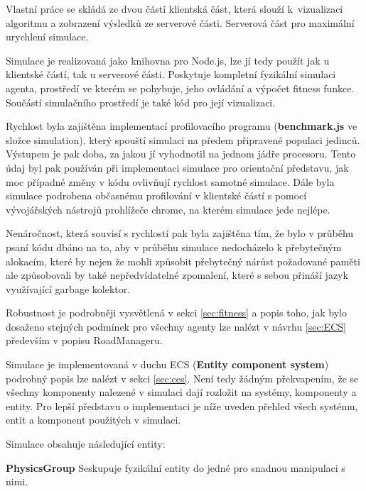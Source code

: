 



Vlastní práce se skládá ze dvou částí klientská část, která slouží k~vizualizaci algoritmu a zobrazení výsledků ze serverové části. Serverová část pro maximální urychlení simulace. 

Simulace je realizovaná jako knihovna pro Node.js, lze jí tedy použít jak u klientské částí, tak u serverové části. Poskytuje kompletní fyzikální simulaci agenta, prostředí ve kterém se pohybuje, jeho ovládání a výpočet fitness funkce. Součástí simulačního prostředí je také kód pro její vizualizaci.


Rychlost byla zajištěna implementací profilovacího programu (\textbf{benchmark.js} ve složce simulation), který spouští simulaci na předem připravené populaci jedinců. Výstupem je pak doba, za jakou jí vyhodnotil na jednom jádře procesoru. Tento údaj byl pak používán při implementaci simulace pro orientační představu, jak moc případné změny v kódu ovlivňují rychlost samotné simulace. Dále byla simulace podrobena občasnému profilování v klientské částí s pomocí vývojářských nástrojů prohlížeče chrome, na kterém simulace jede nejlépe.

Nenáročnost, která souvisí s rychlostí pak byla zajištěna tím, že bylo v průběhu psaní kódu dbáno na to, aby v průběhu simulace nedocházelo k přebytečným alokacím, které by nejen že mohli způsobit přebytečný nárůst požadované paměti ale způsobovali by také nepředvídatelné zpomalení, které s sebou přináší jazyk využívající garbage kolektor.

Robustnost je podrobněji vysvětlená v sekci \ref{sec:fitness} a popis toho, jak bylo dosaženo stejných podmínek pro všechny agenty lze nalézt v návrhu \ref{sec:ECS} především v popisu RoadManageru.

\label{sec:ECS}
Simulace je implementovaná v duchu ECS (\textbf{Entity component system}) podrobný popis lze nalézt v sekci \ref{sec:ces}. Není tedy žádným překvapením, že se všechny komponenty nalezené v simulaci dají rozložit na systémy, komponenty a entity. Pro lepší představu o implementaci je níže uveden přehled všech systému, entit a komponent použitých v simulaci.

Simulace obsahuje následující entity:

\textbf{PhysicsGroup} Seskupuje fyzikální entity do jedné pro snadnou manipulaci s nimi.

